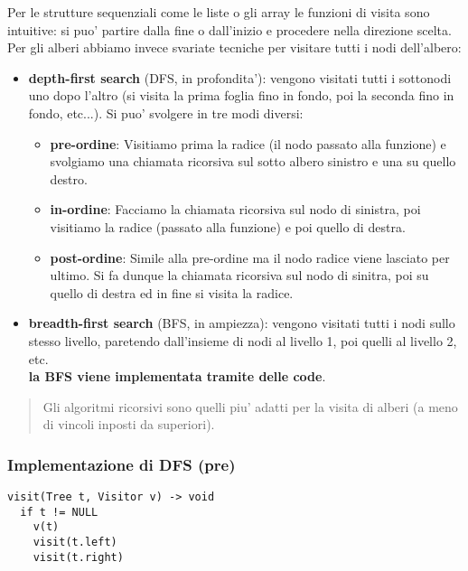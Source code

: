 \documentclass{article}
\begin{document}
Per le strutture sequenziali come le liste o gli array le funzioni di visita sono intuitive:
si puo' partire dalla fine o dall'inizio e procedere nella direzione scelta. Per gli alberi abbiamo
invece svariate tecniche per visitare tutti i nodi dell'albero:

\begin{itemize}
  \item \textbf{depth-first search} (DFS, in profondita'): vengono visitati tutti
  i sottonodi uno dopo l'altro (si visita la prima foglia fino in fondo, poi la
  seconda fino in fondo, etc...). Si puo' svolgere in tre modi diversi:
  \begin{itemize}
    \item \textbf{pre-ordine}: Visitiamo prima la radice (il nodo passato alla funzione) 
      e svolgiamo una chiamata ricorsiva sul sotto albero sinistro e una su quello destro.
    \item \textbf{in-ordine}: Facciamo la chiamata ricorsiva sul nodo di sinistra,
      poi visitiamo la radice (passato alla funzione) e poi quello di destra.
    \item \textbf{post-ordine}: Simile alla pre-ordine ma il nodo radice viene
      lasciato per ultimo. Si fa dunque la chiamata ricorsiva sul nodo di sinitra,
      poi su quello di destra ed in fine si visita la radice.
  \end{itemize}

  \item \textbf{breadth-first search} (BFS, in ampiezza): vengono visitati tutti i nodi sullo
    stesso livello, paretendo dall'insieme di nodi al livello 1, poi quelli al livello 2, etc. \\
    \textbf{la BFS viene implementata tramite delle code}.
\end{itemize}

\begin{quote}
  Gli algoritmi ricorsivi sono quelli piu' adatti per la visita di alberi
  (a meno di vincoli inposti da superiori).
\end{quote}

\subsubsection{Implementazione di DFS (pre)}

\begin{lstlisting}
visit(Tree t, Visitor v) -> void
  if t != NULL
    v(t)
    visit(t.left)
    visit(t.right)
\end{lstlisting}
\end{document}

